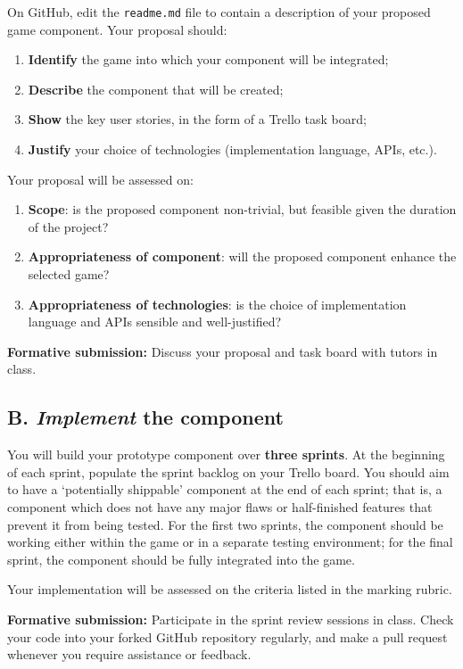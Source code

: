 \documentclass{../fal_assignment}
\begin{document}
On GitHub, edit the \texttt{readme.md} file to contain a description of your proposed game component.
Your proposal should:
\begin{enumerate}
    \item \textbf{Identify} the game into which your component will be integrated;
    \item \textbf{Describe} the component that will be created;
    \item \textbf{Show} the key user stories, in the form of a Trello task board;
    \item \textbf{Justify} your choice of technologies (implementation language, APIs, etc.).
\end{enumerate}
Your proposal will be assessed on:
\begin{enumerate}
    \item \textbf{Scope}:
        is the proposed component non-trivial, but feasible given the duration of the project?
    \item \textbf{Appropriateness of component}:
        will the proposed component enhance the selected game?
    \item \textbf{Appropriateness of technologies}:
        is the choice of implementation language and APIs sensible and well-justified?
\end{enumerate}

\textbf{Formative submission:} Discuss your proposal and task board with tutors in class.

\subsection*{B. \emph{Implement} the component}

You will build your prototype component over \textbf{three sprints}.
At the beginning of each sprint, populate the sprint backlog on your Trello board.
You should aim to have a `potentially shippable' component at the end of each sprint;
that is, a component which does not have any major flaws or half-finished features that prevent it from being tested.
For the first two sprints, the component should be working either within the game or in a separate testing environment;
for the final sprint, the component should be fully integrated into the game.

Your implementation will be assessed on the criteria listed in the marking rubric.

\textbf{Formative submission:} Participate in the sprint review sessions in class.
Check your code into your forked GitHub repository regularly,
and make a pull request whenever you require assistance or feedback.
\end{document}
